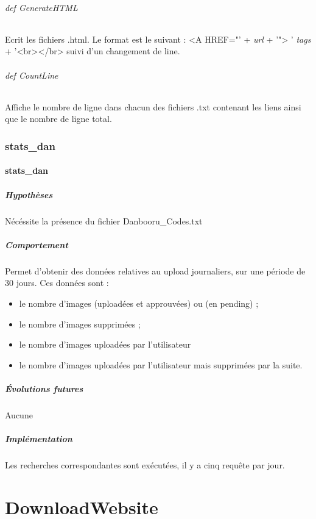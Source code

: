 \documentclass[a4paper,12pt]{article}
\begin{document}
\paragraph{def GenerateHTML}
Ecrit les fichiers .html. Le format est le suivant : \og <A HREF="' + \textit{url} + '"> ' \textit{tags} + '<br></br> \fg{} suivi d'un changement de line.
\paragraph{def CountLine}
Affiche le nombre de ligne dans chacun des fichiers .txt contenant les liens ainsi que le nombre de ligne total.
\section{stats\_dan}
\subsection{stats\_dan}
\subsubsection{Hypothèses}
Nécéssite la présence du fichier Danbooru\_Codes.txt
\subsubsection{Comportement}
Permet d'obtenir des données relatives au upload journaliers, sur une période de 30 jours. Ces données sont :
\begin{itemize}
\item le nombre d'images (uploadées et approuvées) ou (en pending) ;
\item le nombre d'images supprimées ;
\item le nombre d'images uploadées par l'utilisateur
\item le nombre d'images uploadées par l'utilisateur mais supprimées par la suite.
\end{itemize}
\subsubsection{Évolutions futures}
Aucune
\subsubsection{Implémentation}
Les recherches correspondantes sont exécutées, il y a cinq requête par jour.

\part{DownloadWebsite}
\end{document}
